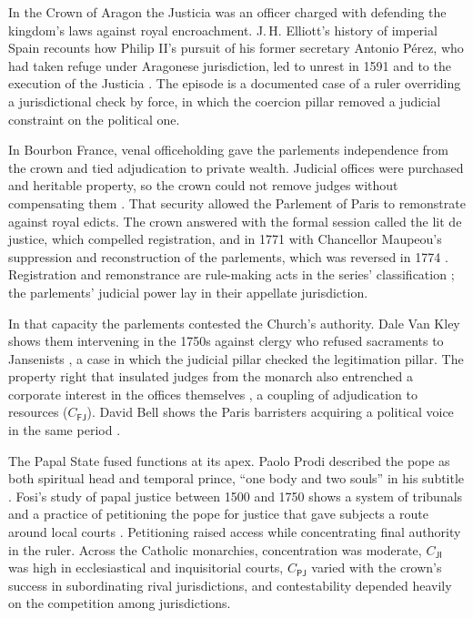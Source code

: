 \documentclass[11pt,letterpaper]{article}
\theoremstyle{definition}
\theoremstyle{remark}
\newcommand{\pF}{\mathsf{F}}
\newcommand{\pP}{\mathsf{P}}
\newcommand{\pJ}{\mathsf{J}}
\newcommand{\pI}{\mathsf{I}}
\begin{document}
In the Crown of Aragon the Justicia was an officer charged with defending the kingdom's laws against royal encroachment. J.\,H. Elliott's history of imperial Spain recounts how Philip II's pursuit of his former secretary Antonio P\'erez, who had taken refuge under Aragonese jurisdiction, led to unrest in 1591 and to the execution of the Justicia \citep{elliott1963}. The episode is a documented case of a ruler overriding a jurisdictional check by force, in which the coercion pillar removed a judicial constraint on the political one.

In Bourbon France, venal officeholding gave the parlements independence from the crown and tied adjudication to private wealth. Judicial offices were purchased and heritable property, so the crown could not remove judges without compensating them \citep{doyle1996}. That security allowed the Parlement of Paris to remonstrate against royal edicts. The crown answered with the formal session called the lit de justice, which compelled registration, and in 1771 with Chancellor Maupeou's suppression and reconstruction of the parlements, which was reversed in 1774 \citep{swann1995}. Registration and remonstrance are rule-making acts in the series' classification \citep{long2026political}; the parlements' judicial power lay in their appellate jurisdiction.

In that capacity the parlements contested the Church's authority. Dale Van Kley shows them intervening in the 1750s against clergy who refused sacraments to Jansenists \citep{vankley1996}, a case in which the judicial pillar checked the legitimation pillar. The property right that insulated judges from the monarch also entrenched a corporate interest in the offices themselves \citep{doyle1996}, a coupling of adjudication to resources ($C_{\pF\pJ}$). David Bell shows the Paris barristers acquiring a political voice in the same period \citep{bell1994}.

The Papal State fused functions at its apex. Paolo Prodi described the pope as both spiritual head and temporal prince, ``one body and two souls'' in his subtitle \citep{prodi1987}. Fosi's study of papal justice between 1500 and 1750 shows a system of tribunals and a practice of petitioning the pope for justice that gave subjects a route around local courts \citep{fosi2011}. Petitioning raised access while concentrating final authority in the ruler. Across the Catholic monarchies, concentration was moderate, $C_{\pJ\pI}$ was high in ecclesiastical and inquisitorial courts, $C_{\pP\pJ}$ varied with the crown's success in subordinating rival jurisdictions, and contestability depended heavily on the competition among jurisdictions.
\end{document}
